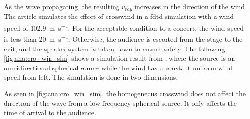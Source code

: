 As the wave propagating, the resulting $v_{ray}$ increases in the direction of the wind. The article \citep{crosswind_simulation} simulates the effect of crosswind in a \gls{fdtd} simulation with a wind speed of \SI{102.9}{\meter\per\second}. For the acceptable condition to a concert, the wind speed is less than \SI{20}{\meter\per\second}. Otherwise, the audience is escorted from the stage to the exit, and the speaker system is taken down to ensure safety. The following \autoref{fig:ana:cro_win_sim} shows a simulation result from \citep{crosswind_simulation}, where the source is an omnidirectional  spherical source while the wind has a constant uniform wind speed from left. The simulation is done in two dimensions.




As seen in \autoref{fig:ana:cro_win_sim}, the homogeneous crosswind does not affect the direction of the wave from a low frequency spherical source. It only affects the time of arrival to the audience.






